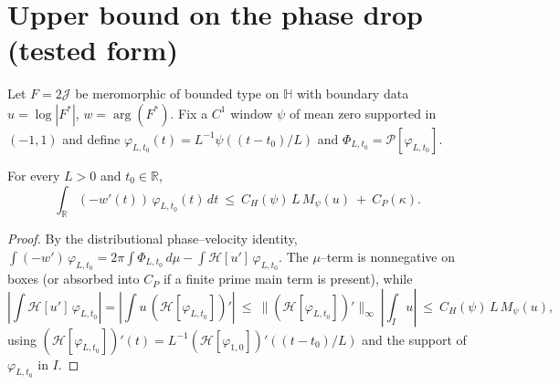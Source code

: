 
\section*{Upper bound on the phase drop (tested form)}

Let $F=2\mathcal J$ be meromorphic of bounded type on $\mathbb{H}$ with boundary data $u=\log|F^*|$, $w=\arg(F^*)$. Fix a $C^1$ window $\psi$ of mean zero supported in $(-1,1)$ and define $\varphi_{L,t_0}(t)=L^{-1}\psi((t-t_0)/L)$ and $\Phi_{L,t_0}=\mathcal P[\varphi_{L,t_0}]$.

\begin{lemma}\label{lem:upper-bound-tested}
For every $L>0$ and $t_0\in\mathbb{R}$,
\[\int_{\mathbb{R}} (-w'(t))\,\varphi_{L,t_0}(t)\,dt\ \le\ C_H(\psi)\,L\,M_\psi(u)\ +\ C_P(\kappa).\]
\end{lemma}

\begin{proof}
By the distributional phase–velocity identity, $\int(-w')\,\varphi_{L,t_0}=2\pi\int \Phi_{L,t_0}\,d\mu-\int \mathcal H[u']\,\varphi_{L,t_0}$. The $\mu$–term is nonnegative on boxes (or absorbed into $C_P$ if a finite prime main term is present), while
\[\left|\int \mathcal H[u']\,\varphi_{L,t_0}\right|=\left|\int u\,(\mathcal H[\varphi_{L,t_0}])'\right|\ \le\ \| (\mathcal H[\varphi_{L,t_0}])'\|_\infty\ \left|\int_I u\right|\ \le\ C_H(\psi)\,L\,M_\psi(u),\]
using $(\mathcal H[\varphi_{L,t_0}])'(t)=L^{-1}(\mathcal H[\varphi_{1,0}])'((t-t_0)/L)$ and the support of $\varphi_{L,t_0}$ in $I$.
\end{proof}
